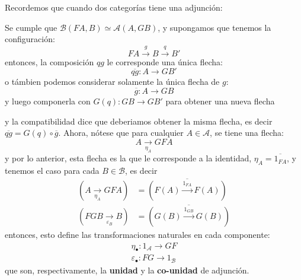 \documentclass[12pt,letterpaper,titlepage]{article}
\theoremstyle{definition}
\newcommand{\panth}[1]{\left({#1}\right)}
\newcommand\<{\langle}
\renewcommand\>{\rangle}
\begin{document}
Recordemos que cuando dos categorías tiene una adjunción:
\begin{center}
\end{center}
Se cumple que $\mathcal{B}(FA,B)\simeq\mathcal{A}(A,GB)$, y supongamos que tenemos la configuración:
\begin{equation*}
    FA\overset{g}{\longrightarrow}B\overset{q}{\longrightarrow}B'
\end{equation*}
entonces, la composición $qg$ le corresponde una única flecha:
\begin{equation*}
    \overline{qg}:A\longrightarrow GB'
\end{equation*}
o támbien podemos considerar solamente la única flecha de $g$:
\begin{equation*}
    \overline{g}:A\longrightarrow GB
\end{equation*}
y luego componerla con $G(q):GB\to GB'$ para obtener una nueva flecha
\begin{center}
\end{center}
y la compatibilidad dice que deberiamos obtener la misma flecha, es decir $\overline{qg}=G(q)\circ\overline{g}$.
Ahora, nótese que para cualquier $A\in\mathcal{A}$, se tiene una flecha:
\begin{equation*}
    A\underset{\eta_A}{\longrightarrow}GFA
\end{equation*}
y por lo anterior, esta flecha es la que le corresponde a la identidad, $\eta_A=\overline{1_{FA}}$, y tenemos el caso para  cada $B\in\mathcal{B}$, es decir
\begin{align*}
    \panth{A\underset{\eta_A}{\longrightarrow}GFA} & = \overline{\panth{F(A)\overset{1_{FA}}{\longrightarrow}F(A)}} \\
    \panth{FGB\underset{\varepsilon_B}{\longrightarrow}B} & = \overline{\panth{G(B)\overset{1_{GB}}{\longrightarrow}G(B)}}
\end{align*}
entonces, esto define las transformaciones naturales en cada componente:
\begin{align*}
    \eta_\bullet: 1_\mathcal{A}\longrightarrow GF \\
    \varepsilon_\bullet: FG\longrightarrow 1_\mathcal{B}
\end{align*}
que son, respectivamente, la \textbf{unidad} y la \textbf{co-unidad} de adjunción.
\end{document}
